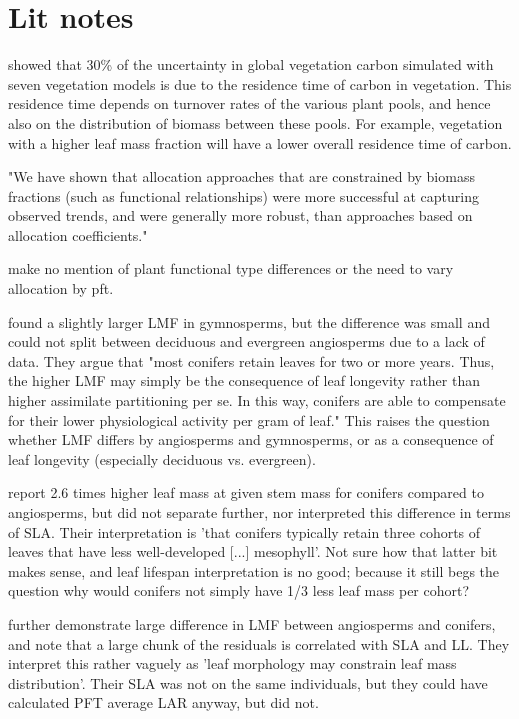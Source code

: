 \documentclass[a4paper]{article}
\begin{document}
\section{Lit notes}

\cite{friend_carbon_2014} showed that 30\% of the uncertainty in global vegetation carbon simulated with seven vegetation models is due to the residence time of carbon in vegetation. This residence time depends on turnover rates of the various plant pools, and hence also on the distribution of biomass between these pools. For example, vegetation with a higher leaf mass fraction will have a lower overall residence time of carbon.

\cite{de2014does} "We have shown that allocation approaches that are constrained by biomass fractions (such as functional relationships) were more successful at capturing observed trends, and were generally more robust, than approaches based on allocation coefficients."

\cite{friedlingstein_toward_1999} make no mention of plant functional type differences or the need to vary allocation by pft.

\cite{poorter_biomass_2012} found a slightly larger LMF in gymnosperms, but the difference was small and could not split between deciduous and evergreen angiosperms due to a lack of data. They argue that "most conifers retain leaves for two or more years. Thus, the higher LMF may simply be the consequence of leaf longevity rather than higher assimilate partitioning per se. In this way, conifers are able to compensate for their lower physiological activity per gram of leaf." This raises the question whether LMF differs by angiosperms and gymnosperms, or as a consequence of leaf longevity (especially deciduous vs. evergreen).

\cite{enquist_global_2002} report 2.6 times higher leaf mass at given stem mass for conifers compared to angiosperms, but did not separate further, nor interpreted this difference in terms of SLA. Their interpretation is 'that conifers typically retain three cohorts of leaves that have less well-developed [...] mesophyll'. Not sure how that latter bit makes sense, and leaf lifespan interpretation is no good; because it still begs the question why would conifers not simply have 1/3 less leaf mass per cohort? 

\cite{mccarthy_consistency_2007} further demonstrate large difference in LMF between angiosperms and conifers, and note that a large chunk of the residuals is correlated with SLA and LL. They interpret this rather vaguely as 'leaf morphology may constrain leaf mass distribution'. Their SLA was not on the same individuals, but they could have calculated PFT average LAR anyway, but did not.
\end{document}
